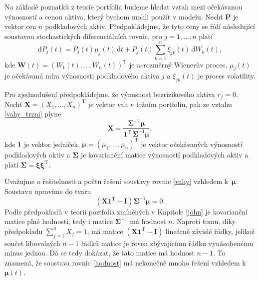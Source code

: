 \documentclass[a4paper,12pt]{report}
\theoremstyle{definition} \newtheorem{definice}[veta]{Definice}
\theoremstyle{remark}
\begin{document}
Na základě poznatků z teorie portfolia budeme hledat vztah mezi očekávanou výnosností a cenou aktiva, který bychom mohli použít v modelu.
Nechť $\boldsymbol{P}$ je vektor cen $n$ podkladových aktiv.
Předpokládejme, že tyto ceny se řídí následující soustavou stochastických diferenciálních rovnic, pro $j=1,\dots,n$ platí
\begin{equation} \label{SDE}
\mathrm{d}P_j(t)=P_j(t)\mu_j(t)\,\mathrm{d}t+P_j(t)\sum_{k=1}^{n}\xi_{jk}(t)\,\mathrm{d}W_k(t),
\end{equation}
kde $\boldsymbol{W}(t)=(W_1(t),\dots,W_n(t))^\mathrm{T}$ je $n$-rozměrný Wienerův proces, $\mu_j(t)$ je očekávaná míra výnosnosti podkladového aktiva $j$ a $\xi_{jk}(t)$ je proces volatility. 

Pro zjednodušení předpokládejme, že výnosnost bezrizikového aktiva $r_f=0$.
Nechť $\boldsymbol{X}=(X_1,\dots,X_n)^\mathrm{T}$ je vektor vah v tržním portfoliu, pak ze vztahu \eqref{vahy_trzni} plyne
\begin{equation} \label{vahy}
\boldsymbol{X}=\frac{\boldsymbol{\Sigma}^{-1}\boldsymbol{\mu}}{\boldsymbol{1}^\mathrm{T}\,\boldsymbol{\Sigma}^{-1}\boldsymbol{\mu}},
\end{equation}
kde $\boldsymbol{1}$ je vektor jedniček, $\boldsymbol{\mu}=(\mu_1,\dots,\mu_n)^\mathrm{T}$ je vektor očekávaných výnosností podkladových aktiv a $\boldsymbol{\Sigma}$ je kovarianční matice výnosností podkladových aktiv a platí $\boldsymbol{\Sigma}=\boldsymbol{\xi}\boldsymbol{\xi}^\mathrm{T}$.

Uvažujme o řešitelnosti a počtu řešení soustavy rovnic \eqref{vahy} vzhledem k~$\boldsymbol{\mu}$.
Soustavu upravíme do tvaru %
\begin{equation} \label{hodnost}
\left(\boldsymbol{X}\boldsymbol{1}^\mathrm{T}-\mathbf{I}\right)\boldsymbol{\Sigma}^{-1}\boldsymbol{\mu}=0.
\end{equation}
Podle předpokladů v teorii portfolia zmíněných v Kapitole \ref{john} je kovarianční matice plné hodnosti, tedy i matice $\boldsymbol{\Sigma}^{-1}$ má hodnost $n$.
Naproti tomu, díky předpokladu $\sum_{j=1}^nX_j=1$, má matice $\left(\boldsymbol{X}\boldsymbol{1}^\mathrm{T}-\mathbf{I}\right)$ lineárně závislé řádky, jelikož
součet libovolných $n-1$ řádků matice  je roven zbývajícímu řádku vynásobenému minus jednou.
Dá se tedy dokázat, že tato matice má hodnost $n-1$.
To znamená, že soustava rovnic \eqref{hodnost} má nekonečně mnoho řešení vzhledem k $\boldsymbol{\mu}(t)$.
\end{document}
